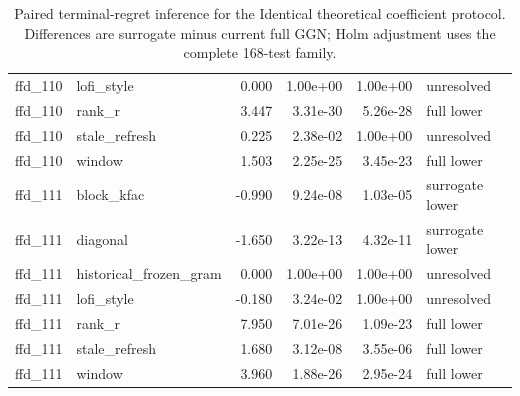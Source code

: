 \begin{table}[p]
\begin{tabular}{llrrrl}
ffd\_110 & lofi\_style & 0.000 & 1.00e+00 & 1.00e+00 & unresolved \\
ffd\_110 & rank\_r & 3.447 & 3.31e-30 & 5.26e-28 & full lower \\
ffd\_110 & stale\_refresh & 0.225 & 2.38e-02 & 1.00e+00 & unresolved \\
ffd\_110 & window & 1.503 & 2.25e-25 & 3.45e-23 & full lower \\
ffd\_111 & block\_kfac & -0.990 & 9.24e-08 & 1.03e-05 & surrogate lower \\
ffd\_111 & diagonal & -1.650 & 3.22e-13 & 4.32e-11 & surrogate lower \\
ffd\_111 & historical\_frozen\_gram & 0.000 & 1.00e+00 & 1.00e+00 & unresolved \\
ffd\_111 & lofi\_style & -0.180 & 3.24e-02 & 1.00e+00 & unresolved \\
ffd\_111 & rank\_r & 7.950 & 7.01e-26 & 1.09e-23 & full lower \\
ffd\_111 & stale\_refresh & 1.680 & 3.12e-08 & 3.55e-06 & full lower \\
ffd\_111 & window & 3.960 & 1.88e-26 & 2.95e-24 & full lower \\
\bottomrule
\end{tabular}
\caption{Paired terminal-regret inference for the Identical theoretical coefficient protocol. Differences are surrogate minus current full GGN; Holm adjustment uses the complete 168-test family.}
\label{tab:coverage-matched-comparisons}
\end{table}

